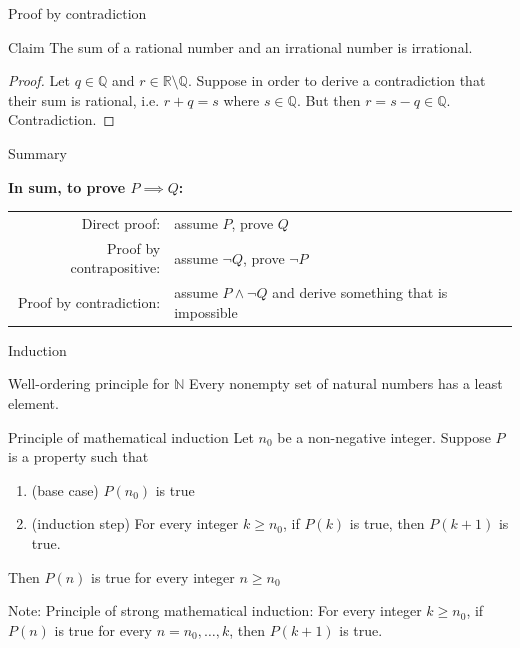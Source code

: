 \documentclass [aspectratio=169]{beamer}
\begin{document}
\begin{frame}{Proof by contradiction}
\begin{exampleblock}{Claim}
The sum of a rational number and an irrational number is irrational.
\end{exampleblock}

\begin{proof}
Let $q \in \mathbb{Q}$ and $r \in \mathbb{R} \setminus \mathbb{Q}$.
Suppose in order to derive a contradiction that their sum is rational, i.e. $ r + q = s$ where $s \in \mathbb{Q}$.
But then $r = s - q \in \mathbb{Q}$. Contradiction.
\end{proof}
\end{frame}



\begin{frame}{Summary}

{\bf In sum, to prove $P \implies Q$:} \\

\vspace{1em}


\begin{tabular}{r l}
     Direct proof:  & assume $P$, prove $Q$ \\
     Proof by contrapositive:  & assume $\neg Q$, prove $\neg P$ \\ 
     Proof by contradiction: & assume $P \wedge \neg Q$ and derive something that is impossible \\ 
\end{tabular}

\end{frame}


\begin{frame}{Induction}

\begin{block}{Well-ordering principle for $\mathbb{N}$}
Every nonempty set of natural numbers has a least element.
\end{block}

\begin{block}{Principle of mathematical induction}
Let $n_0$ be a non-negative integer. Suppose $P$ is a property such that 
\begin{enumerate}
\item(base case) $P(n_0)$ is true 
\item (induction step) For every integer $k \geq n_0$, if $P(k)$ is true, then $P(k+1)$ is true.
\end{enumerate}
Then $P(n)$ is true for every integer $n \geq n_0$
\end{block}

Note: Principle of strong mathematical induction: For every integer $k \geq n_0$, if $P(n)$ is true for every $n = n_0, \ldots, k$, then $P(k+1)$ is true.
\end{frame}
\end{document}
